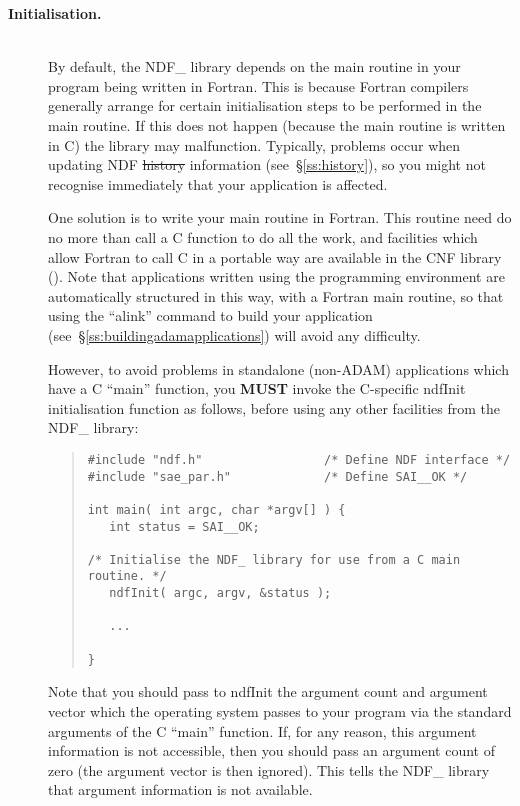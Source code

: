\begin{description}
\item[{\bf{Initialisation.}}]\mbox{}\\
By default, the NDF\_ library depends on the main routine in your
program being written in Fortran. This is because Fortran compilers
generally arrange for certain initialisation steps to be performed in
the main routine. If this does not happen (because the main routine is
written in C) the library may malfunction. Typically, problems occur
when updating NDF \st{history\/} information (see~\S\ref{ss:history}),
so you might not recognise immediately that your application is
affected.

One solution is to write your main routine in Fortran. This routine
need do no more than call a C function to do all the work, and
facilities which allow Fortran to call C in a portable way are
available in the CNF library (). Note that
applications written using the  programming
environment are automatically structured in this way, with a Fortran
main routine, so that using the ``alink'' command to build your
application (see~\S\ref{ss:buildingadamapplications}) will avoid any
difficulty.

However, to avoid problems in standalone (non-ADAM) applications which
have a C ``main'' function, you {\bf{MUST}} invoke the C-specific
ndfInit initialisation function as follows, before using any other
facilities from the NDF\_ library:

\small
\begin{quote}
\begin{verbatim}
#include "ndf.h"                 /* Define NDF interface */
#include "sae_par.h"             /* Define SAI__OK */

int main( int argc, char *argv[] ) {
   int status = SAI__OK;

/* Initialise the NDF_ library for use from a C main routine. */
   ndfInit( argc, argv, &status );

   ...

}
\end{verbatim}
\end{quote}
\normalsize

Note that you should pass to ndfInit the argument count and argument
vector which the operating system passes to your program via the
standard arguments of the C ``main'' function. If, for any reason,
this argument information is not accessible, then you should pass an
argument count of zero (the argument vector is then ignored). This
tells the NDF\_ library that argument information is not available.


\end{description}
